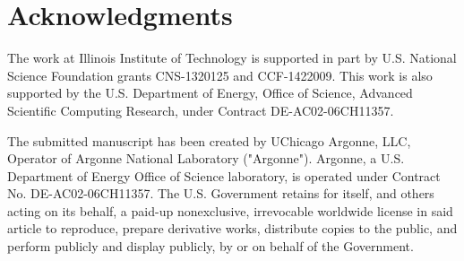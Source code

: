 \documentclass[conference,compsoc]{IEEEtran}
\begin{document}



\ifCLASSOPTIONcompsoc
  \section*{Acknowledgments}
\else
\fi


The work at Illinois Institute of Technology is supported in part by U.S. National Science Foundation grants CNS-1320125 and CCF-1422009. This work is also supported by the U.S. Department of Energy, Office of Science, Advanced Scientific Computing Research, under Contract DE-AC02-06CH11357.





  


 \vspace{1\baselineskip}
 
 \begin{framed}
 The submitted manuscript has been created by UChicago Argonne, LLC, Operator of Argonne National Laboratory ("Argonne").  Argonne, a U.S. Department of Energy Office of Science laboratory, is operated under Contract No. DE-AC02-06CH11357.  The U.S. Government retains for itself, and others acting on its behalf, a paid-up nonexclusive, irrevocable worldwide license in said article to reproduce, prepare derivative works, distribute copies to the public, and perform publicly and display publicly, by or on behalf of the Government.
 \end{framed}




\end{document}
